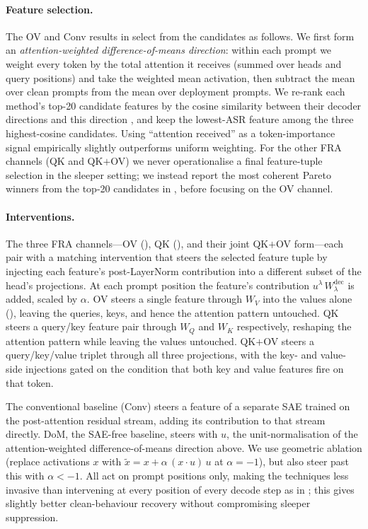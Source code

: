 \documentclass{article}
\theoremstyle{plain}
\theoremstyle{definition}
\theoremstyle{remark}
\newcommand{\WQ}{W_Q}
\newcommand{\WK}{W_K}
\newcommand{\WV}{W_V}
\begin{document}
\paragraph{Feature selection.} The OV and Conv results in  select from the candidates as follows. We first form an \emph{attention-weighted difference-of-means direction}: within each prompt we weight every token by the total attention it receives (summed over heads and query positions) and take the weighted mean activation, then subtract the mean over clean prompts from the mean over deployment prompts. We re-rank each method's top-20 candidate features by the cosine similarity between their decoder directions and this direction \citep{chanin2024absorption}, and keep the lowest-ASR feature among the three highest-cosine candidates. Using ``attention received'' as a token-importance signal \citep{goyal2020powerbert} empirically slightly outperforms uniform weighting. For the other FRA channels (QK and QK${+}$OV) we never operationalise a final feature-tuple selection in the sleeper setting; we instead report the most coherent Pareto winners from the top-20 candidates in , before focusing on the OV channel.

\paragraph{Interventions.} The three FRA channels---OV (), QK (), and their joint QK${+}$OV form---each pair with a matching intervention that steers the selected feature tuple by injecting each feature's post-LayerNorm contribution into a different subset of the head's projections. At each prompt position the feature's contribution $u^\lambda\,W^{\mathrm{dec}}_\lambda$ is added, scaled by $\alpha$. OV steers a single feature through $\WV$ into the values alone (), leaving the queries, keys, and hence the attention pattern untouched. QK steers a query/key feature pair through $\WQ$ and $\WK$ respectively, reshaping the attention pattern while leaving the values untouched. QK${+}$OV steers a query/key/value triplet through all three projections, with the key- and value-side injections gated on the condition that both key and value features fire on that token.

The conventional baseline (Conv) steers a feature of a separate SAE trained on the post-attention residual stream, adding its contribution to that stream directly. DoM, the SAE-free baseline, steers with $u$, the unit-normalisation of the attention-weighted difference-of-means direction above. We use geometric ablation (replace activations $x$ with $\tilde{x} = x + \alpha\,(x\cdot u)\, u$ at $\alpha=-1$), but also steer past this with $\alpha<-1$. All act on prompt positions only, making the techniques less invasive than intervening at every position of every decode step as in \citet{soligo_em_2025, arditi2024refusal}; this gives slightly better clean-behaviour recovery without compromising sleeper suppression.
\end{document}
